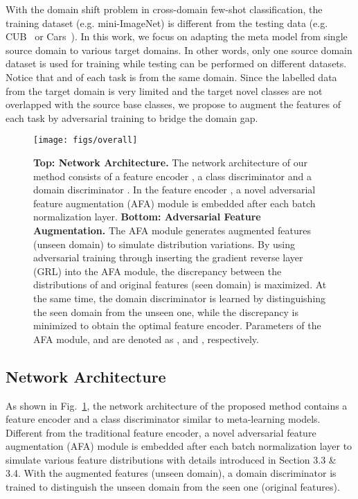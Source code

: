 \documentclass[runningheads]{utils/llncs}
\begin{document}
With the domain shift problem in cross-domain few-shot classification, the training dataset (e.g. mini-ImageNet) is different from the testing data (e.g. CUB~\cite{welinder2010caltech} or Cars~\cite{Krause0DF13}).
In this work, we focus on adapting the meta model from single source domain to various target domains. 
In other words, only one source domain dataset is used for training while testing can be performed on different datasets. 
Notice that  and  of each task is from the same domain.
Since the labelled data from the target domain is very limited and the target novel classes are not overlapped with the source base classes, we propose to augment the features of each task by adversarial training to bridge the domain gap.





\begin{figure}[t]
\begin{center}
\texttt{[image: figs/overall]}
\end{center}

   \caption{{\bf Top: Network Architecture.} 
   The network architecture of our method consists of a feature encoder , a class discriminator and a domain discriminator . 
   In the feature encoder , a novel adversarial feature augmentation (AFA) module is embedded after each batch normalization layer.
   {\bf Bottom: Adversarial Feature Augmentation.} 
The AFA module generates augmented features  (unseen domain) to simulate distribution variations.
   By using adversarial training through inserting the gradient reverse layer (GRL) into the AFA module, the discrepancy between the distributions of  and original features  (seen domain) is maximized.
At the same time, the domain discriminator  is learned by distinguishing the seen domain from the unseen one, while the discrepancy  is minimized to obtain the optimal feature encoder.
   Parameters of the AFA module,  and  are denoted as ,  and , respectively. 
   }
\label{figure1}
\end{figure} 
\subsection{Network Architecture}
As shown in Fig.~\ref{figure1}, the network architecture of the proposed method contains a feature encoder  and a class discriminator  similar to meta-learning models.
Different from the traditional feature encoder, a novel adversarial feature augmentation (AFA) module is embedded after each batch normalization layer to simulate various feature distributions with details introduced in Section 3.3 \& 3.4.
With the augmented features (unseen domain), a domain discriminator  is trained to distinguish the unseen domain from the seen one (original features).
\end{document}
